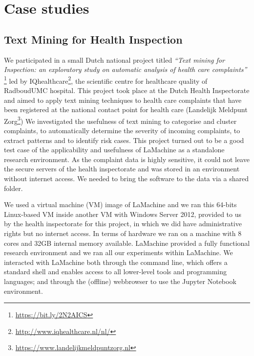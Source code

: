 \documentclass[a4paper,11pt]{article}
\begin{document}
\section{Case studies}
\label{sec:case}

\subsection{Text Mining for Health Inspection}

We participated in a small Dutch national project titled \emph{``Text mining for Inspection: an exploratory study on
automatic analysis of health care complaints''} \footnote{\url{https://bit.ly/2N2AICS}} %
led by IQhealthcare\footnote{\url{http://www.iqhealthcare.nl/nl/}}, the scientific centre for healthcare quality of RadboudUMC hospital.
This project took place at the Dutch Health Inspectorate and aimed to apply text mining techniques to health care
complaints that have been registered at the national contact point for health care (Landelijk Meldpunt
Zorg\footnote{\url{https://www.landelijkmeldpuntzorg.nl}})
We investigated the usefulness of text mining to categorise and cluster complaints, to automatically determine the
severity of incoming complaints, to extract patterns  and to identify risk cases. This project turned out to be a good
test case of the applicability and usefulness of LaMachine as a standalone research environment.
As the complaint data is highly sensitive, it could not leave the secure servers of the health inspectorate and was
stored in an environment without internet access. We needed to bring the software to the data via a shared folder.

We used a virtual machine (VM) image of LaMachine and we ran this 64-bits Linux-based VM inside another
VM with Windows Server 2012, provided to us by the health inspectorate for this project, in which we did have administrative
rights but no internet access. In terms of hardware we ran on a machine with 8 cores and  32GB internal memory available.
LaMachine provided a fully functional research environment and we ran all our experiments within LaMachine. We interacted with LaMachine both through the command line, which offers a standard
shell and enables access to all lower-level tools and programming languages; and through the (offline) webbrowser to use
the Jupyter Notebook environment.
\end{document}
